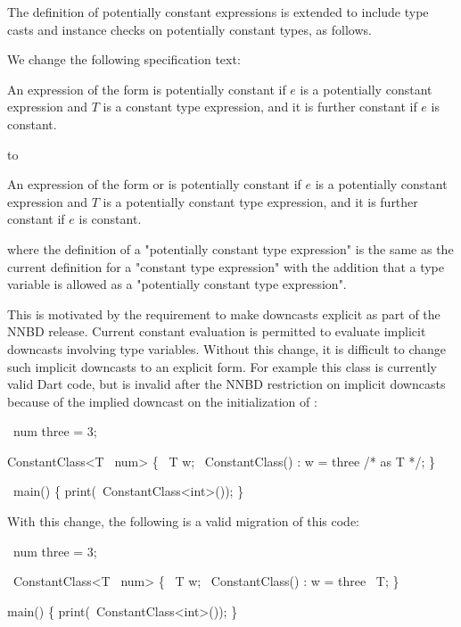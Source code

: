 \documentclass[makeidx]{article}
\begin{document}
{The definition of potentially constant expressions is extended to include type
casts and instance checks on potentially constant types, as follows.

We change the following specification text:

An expression of the form  is potentially constant
if $e$ is a potentially constant expression
and $T$ is a constant type expression,
and it is further constant if $e$ is constant.
\EndCase

to

An expression of the form  or
 is potentially constant
if $e$ is a potentially constant expression
and $T$ is a potentially constant type expression,
and it is further constant if $e$ is constant.
\EndCase

where the definition of a "potentially constant type expression" is the same as
the current definition for a "constant type expression" with the addition that a
type variable is allowed as a "potentially constant type expression".

This is motivated by the requirement to make downcasts explicit as part of the
NNBD release.  Current constant evaluation is permitted to evaluate implicit
downcasts involving type variables.  Without this change, it is difficult to
change such implicit downcasts to an explicit form.  For example this class is
currently valid Dart code, but is invalid after the NNBD restriction on implicit
downcasts because of the implied downcast on the initialization of :


\begin{dartCode}
\CONST\ num three = 3;

\CLASS{} ConstantClass<T \EXTENDS\ num> \{
  \FINAL\ T w;
  \CONST\ ConstantClass() : w = three /* as T */;
\}

\VOID\ main() \{
  print(\CONST\ ConstantClass<int>());
\}
\end{dartCode}

With this change, the following is a valid migration of this code:

\begin{dartCode}
\CONST\ num three = 3;

\CLASS\ ConstantClass<T \EXTENDS\ num> \{
  \FINAL\ T w;
  \CONST\ ConstantClass() : w = three \AS\ T;
\}

\VOID{} main() \{
  print(\CONST\ ConstantClass<int>());
\}
\end{dartCode}

}
\end{document}
